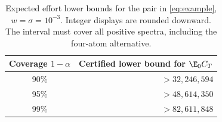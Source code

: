 \begin{table}[tb]
\centering
\caption{Expected effort lower bounds for the pair in \eqref{eq:example}, $w=\sigma=10^{-3}$. Integer displays are rounded downward. The interval must cover all positive spectra, including the four-atom alternative.}\label{tab:cost}
\begin{tabular}{cr}\toprule
Coverage $1-\alpha$ & Certified lower bound for $\E_0 C_T$\\\midrule
90\% & $>32,246,594$\\
95\% & $>48,614,350$\\
99\% & $>82,611,848$\\
\bottomrule\end{tabular}
\end{table}
